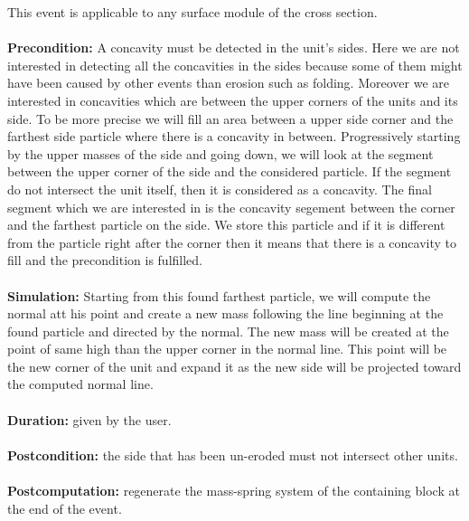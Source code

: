 \documentclass[12pt, a4paper]{report} %
\begin{document}
This event is applicable to any surface module of the cross section.\\\\
\textbf{Precondition:} A concavity must be detected in the unit's sides. Here we are not interested in detecting all the concavities in the sides because some of them might have been caused by other events than erosion such as folding. Moreover we are interested in concavities which are between the upper corners of the units and its side. To be more precise we will fill an area between a upper side corner and the farthest side particle where there is a concavity in between. Progressively starting by the upper masses of the side and going down, we will look at the segment between the upper corner of the side and the considered particle. If the segment do not intersect the unit itself, then it is considered as a concavity. The final segment which we are interested in is the concavity segement between the corner and the farthest particle on the side. We store this particle and if it is different from the particle right after the corner then it means that there is a concavity to fill and the precondition is fulfilled.\\\\
\textbf{Simulation:}  Starting from this found farthest particle, we will compute the normal att his point and create a new mass following the line beginning at the found particle and directed by the normal. The new mass will be created at the point of same high than the upper corner in the normal line. This point will be the new corner of the unit and expand it as the new side will be projected toward the computed normal line.\\\\
\textbf{Duration:} given by the user.\\\\
\textbf{Postcondition:} the side that has been un-eroded must not intersect other units.\\\\
\textbf{Postcomputation:} regenerate the mass-spring system of the containing block at the end of the event.\\\\
\end{document}
